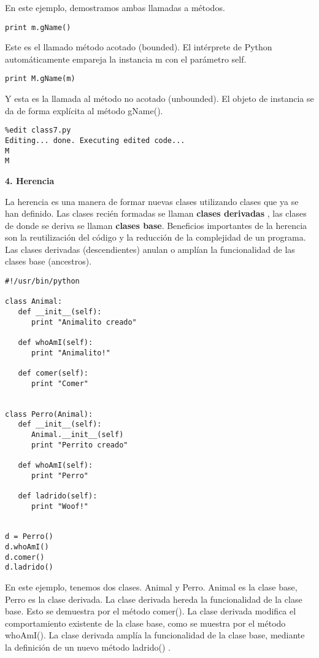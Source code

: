 \documentclass[twoside,10.5pt]{article}%
\begin{document}
En este ejemplo, demostramos ambas llamadas a m\'etodos.

\begin{verbatim}
print m.gName()
\end{verbatim}

Este es el llamado m\'etodo  acotado (bounded). El int\'erprete de Python  autom\'aticamente empareja  la instancia  m con el par\'ametro self.

\begin{verbatim}
print M.gName(m)
\end{verbatim}

Y esta es la llamada al m\'etodo no acotado (unbounded). El objeto de instancia se da de forma expl\'icita al m\'etodo gName().

\begin{verbatim}
%edit class7.py
Editing... done. Executing edited code...
M
M
\end{verbatim}

\textbf{4. Herencia}

La herencia es una manera de formar nuevas clases utilizando clases que ya se han definido. Las clases reci\'en formadas se llaman \textbf{clases derivadas} , las clases de donde se deriva se llaman  \textbf{clases base}. Beneficios importantes de la herencia son la reutilizaci\'on del código y la reducci\'on de la complejidad de un programa. Las clases derivadas (descendientes) anulan o ampl\'ian la funcionalidad de las clases base (ancestros).

\begin{verbatim}
#!/usr/bin/python

class Animal:
   def __init__(self):
      print "Animalito creado"

   def whoAmI(self):
      print "Animalito!"

   def comer(self):
      print "Comer"


class Perro(Animal):
   def __init__(self):
      Animal.__init__(self)
      print "Perrito creado"

   def whoAmI(self):
      print "Perro"

   def ladrido(self):
      print "Woof!"


d = Perro()
d.whoAmI()
d.comer()
d.ladrido()
\end{verbatim}

En este ejemplo, tenemos dos clases. Animal y Perro. Animal es la clase base, Perro es la clase derivada. La clase derivada hereda la funcionalidad de la clase base. Esto se  demuestra por el m\'etodo comer(). La clase derivada modifica el comportamiento existente de la clase base, como se muestra por el m\'etodo whoAmI(). La clase derivada ampl\'ia la funcionalidad de la clase base, mediante la definici\'on de un nuevo m\'etodo ladrido() .
\end{document}
